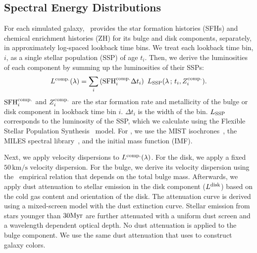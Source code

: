 
\subsection{Spectral Energy Distributions} \label{sec:sed}
For each simulated galaxy, \lgal~provides the star formation histories (SFHs)
and chemical enrichment histories (ZH) for its bulge and disk components,
separately, in approximately log-spaced lookback time bins.  
We treat each lookback time bin, $i$, as a single stellar population (SSP) of
age $t_i$.
Then, we derive the luminosities of each component by summing up the
luminosities of their SSPs:
\begin{equation}
    L^{\rm comp.}(\lambda) = \sum \limits_i \left({\rm SFH}^{\rm comp.}_i
    \Delta t_i\right)~L_{\rm SSP}(\lambda\,;\, t_i, Z^{\rm comp.}_i). 
\end{equation}
${\rm SFH}^{\rm comp.}_i$ and $Z^{\rm comp.}_i$ are the star formation rate and
metallicity of the bulge or disk component in lookback time bin $i$. 
$\Delta t_i$ is the width of the bin. 
$L_{\rm SSP}$ corresponds to the luminosity of the SSP, which we calculate
using the Flexible Stellar Population Synthesis~\citep[\fsps;][]{conroy2009,
conroy2010c} model.
For \fsps, we use the MIST isochrones~\citep{paxton2011, paxton2013, paxton2015,
choi2016, dotter2016}, the MILES spectral library~\citep{sanchez-blazquez2006},
and the \cite{chabrier2003} initial mass function (IMF). 

Next, we apply velocity dispersions to $L^{\rm comp.}(\lambda)$.
For the disk, we apply a fixed $50\,\mathrm{km/s}$ velocity dispersion. 
For the bulge, we derive its velocity dispersion using the~\cite{zahid2016}
empirical relation that depends on the total bulge mass.
Afterwards, we apply dust attenuation to stellar emission in the disk component
($L^{\rm disk}$) based on the cold gas content and orientation of the disk. 
The attenuation curve is derived using a mixed-screen model with the
\cite{mathis1983} dust extinction curve. 
Stellar emission from stars younger than $30{\rm Myr}$ are further attenuated
with a uniform dust screen and a wavelength dependent optical depth.
No dust attenuation is applied to the bulge component.
We use the same dust attenuation that \cite{henriques2015} uses to construct
galaxy colors. 

